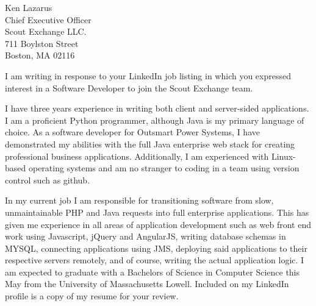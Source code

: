 \documentclass[11pt]{letter} %
\begin{document}
\begin{letter}{Ken Lazarus \\
Chief Executive Officer \\
Scout Exchange LLC. \\
711 Boylston Street \\
Boston, MA 02116 
}

I am writing in response to your LinkedIn job listing in which you expressed interest in a Software Developer to join the Scout Exchange team.


I have three years experience in writing both client and server-sided applications. I am a proficient Python programmer, although Java is my primary language of choice. As a software developer for Outsmart Power Systems, I have demonstrated my abilities with the full Java enterprise web stack for creating professional business applications. Additionally, I am experienced with Linux-based operating systems and am no stranger to coding in a team using version control such as github.

 

In my current job I am responsible for transitioning software from slow, unmaintainable PHP and Java requests into full enterprise applications. This has given me experience in all areas of application development such as web front end work using Javascript, jQuery and AngularJS, writing database schemas in MYSQL, connecting applications using JMS, deploying said applications to their respective servers remotely, and of course, writing the actual application logic. I am expected to graduate with a Bachelors of Science in Computer Science this May from the University of Massachusetts Lowell. Included on my LinkedIn profile is a copy of my resume for your review.


\end{letter}
\end{document}
